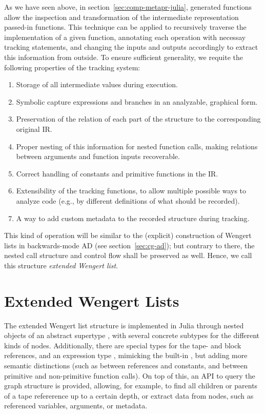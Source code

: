 As we have seen above, in section~\ref{sec:comp-metapr-julia}, generated functions allow the
inspection and transformation of the intermediate representation passed-in functions.  This
technique can be applied to recursively traverse the implementation of a given function, annotating
each operation with necessay tracking statements, and changing the inputs and outputs accordingly to
extract this information from outside.  To ensure sufficient generality, we requite the following
properties of the tracking system:
\begin{enumerate}
  \firmlist
\item Storage of all intermediate values during execution.
\item Symbolic capture expressions and branches in an analyzable, graphical form.
\item Preservation of the relation of each part of the structure to the corresponding original IR.
\item Proper nesting of this information for nested function calls, making relations between
  arguments and function inputs recoverable.
\item Correct handling of constants and primitive functions in the IR.
\item Extensibility of the tracking functions, to allow multiple possible ways to analyze code
  (e.g., by different definitions of what should be recorded).
\item A way to add custom metadata to the recorded structure during tracking.
\end{enumerate}
This kind of operation will be similar to the (explicit) construction of Wengert lists in
backwards-mode AD (see section~\ref{sec:cg-ad}); but contrary to there, the nested call structure
and control flow shall be preserved as well.  Hence, we call this structure \emph{extended Wengert
  list}.  

\section{Extended Wengert Lists}
\label{sec:exteded-wengert-lists}

The extended Wengert list structure is implemented in Julia through nested objects of an abstract
supertype , with several concrete subtypes for the different kinds of nodes.
Additionally, there are special types for the tape- and block references, and an expression type
, mimicking the built-in , but adding more semantic distinctions
(such as between references and constants, and between primitive and non-primitive function calls).
On top of this, an API to query the graph structure is provided, allowing, for example, to find all
children or parents of a tape refererence up to a certain depth, or extract data from nodes, such as
referenced variables, arguments, or metadata.


